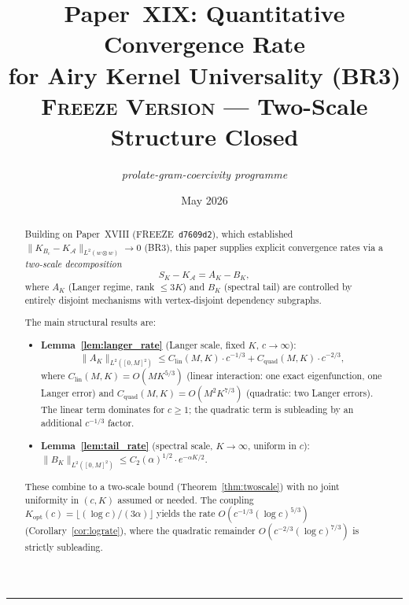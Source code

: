 \documentclass[12pt,a4paper]{amsart}
\theoremstyle{definition}
\newcommand{\cA}{\mathcal{A}}
\newcommand{\cK}{K_{B_c}}
\newcommand{\cKA}{K_{\cA}}
\newcommand{\normh}[2]{\|#1\|_{#2}}
\newcommand{\SK}{S_K}
\newcommand{\Clin}{C_{\mathrm{lin}}(M,K)}
\newcommand{\Cquad}{C_{\mathrm{quad}}(M,K)}
\newcommand{\Kopt}{K_{\mathrm{opt}}}
\newcommand{\AK}{A_K}
\newcommand{\BK}{B_K}
\begin{document}
\title[Paper XIX: Quantitative Rate for BR3]{%
  Paper~XIX: Quantitative Convergence Rate\\[0.3em]
  \large for Airy Kernel Universality (BR3)\\[0.2em]
  \normalsize\textsc{Freeze Version} --- Two-Scale Structure Closed}

\author{\textit{prolate-gram-coercivity programme}}
\date{May 2026}

\begin{abstract}
Building on Paper~XVIII (FREEZE~\texttt{d7609d2}),
which established $\normh{\cK - \cKA}{L^2(w\otimes w)}\to 0$ (BR3),
this paper supplies explicit convergence rates
via a \emph{two-scale decomposition}
\begin{equation}\label{eq:decomp_abstract}
  \SK - \cKA = \AK - \BK,
\end{equation}
where $\AK$ (Langer regime, rank $\leq 3K$) and
$\BK$ (spectral tail) are controlled by entirely disjoint mechanisms
with vertex-disjoint dependency subgraphs.

The main structural results are:
\begin{itemize}[nosep]
  \item \textbf{Lemma~\ref{lem:langer_rate}} (Langer scale,
    fixed $K$, $c\to\infty$):
    \[
      \normh{\AK}{L^2([0,M]^2)}
      \leq \Clin\cdot c^{-1/3} + \Cquad\cdot c^{-2/3},
    \]
    where $\Clin = O(MK^{5/3})$ (linear interaction: one exact
    eigenfunction, one Langer error) and
    $\Cquad = O(M^2K^{7/3})$ (quadratic: two Langer errors).
    The linear term dominates for $c\geq 1$;
    the quadratic term is subleading by an additional $c^{-1/3}$ factor.
  \item \textbf{Lemma~\ref{lem:tail_rate}} (spectral scale,
    $K\to\infty$, uniform in $c$):
    $\normh{\BK}{L^2([0,M]^2)}\leq C_2(\alpha)^{1/2}\cdot e^{-\alpha K/2}$.
\end{itemize}
These combine to a two-scale bound
(Theorem~\ref{thm:twoscale}) with no joint uniformity in
$(c,K)$ assumed or needed.
The coupling $\Kopt(c) = \lfloor(\log c)/(3\alpha)\rfloor$
yields the rate $O(c^{-1/3}(\log c)^{5/3})$
(Corollary~\ref{cor:lograte}), where the quadratic remainder
$O(c^{-2/3}(\log c)^{7/3})$ is strictly subleading.
\end{abstract}

\maketitle
\tableofcontents
\bigskip\hrule\bigskip
\end{document}
